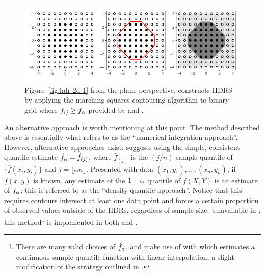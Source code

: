 \begin{knitrout}
\color{fgcolor}\begin{figure}[h!]

{\centering \includegraphics[width=\maxwidth]{figures/hdr-2d-2-1}

}

\caption{Figure~\ref{fig:hdr-2d-1} from the plane perspective.  constructs HDRS by applying the marching squares contouring algorithm to binary grid where $f_{ij} \geq f_{\alpha}$ provided by  and .}\label{fig:hdr-2d-2}
\end{figure}

\end{knitrout}


%
%

\pagebreak

An alternative approach is worth mentioning at this point.
The method described above is essentially what \cite{hyndman_computing_1996} refers to as the ``numerical integration approach''.
However, alternative approaches exist.
\cite{hyndman_computing_1996} suggests using the simple, consistent quantile estimate $\hat{f}_{\alpha} = \hat{f}_{(j)}$, where $\hat{f}_{(j)}$ is the $\left(j/n\right)$ sample quantile of $\{ \hat{f}(x_i,y_i)\}$ and $j = \lfloor\alpha n\rfloor$.
Presented with data $(x_{1},y_{1}), \ldots, (x_{n}, y_{n})$, if $f(x,y)$ is known, any estimate of the $1-\alpha$ quantile of $f(X,Y)$ is an estimate of $f_{\alpha}$; this is referred to as the ``density quantile approach''.
Notice that this requires contours intersect at least one data point and forces a certain proportion of observed values outside of the HDRs, regardless of sample size.
Unavailable in , this method\footnote{There are many valid choices of $\hat{f}_{\alpha}$,  and  make use of  with  which estimates a continuous sample quantile function with linear interpolation, a slight modification of the strategy outlined in \cite{hyndman_computing_1996}.} is implemented in both  \citep{hyndman_hdrcde_2021} and  \citep{ohara-wild_gghdr_2022}.



